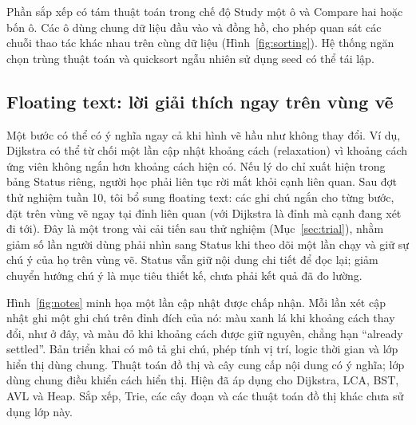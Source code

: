 \documentclass[11pt,a4paper]{article}
\begin{document}
\FloatBarrier
Phần sắp xếp có tám thuật toán trong chế độ Study một ô và Compare hai hoặc bốn ô. Các ô dùng chung dữ liệu đầu vào và đồng hồ, cho phép quan sát các chuỗi thao tác khác nhau trên cùng dữ liệu (Hình~\ref{fig:sorting}). Hệ thống ngăn chọn trùng thuật toán và quicksort ngẫu nhiên sử dụng seed có thể tái lập.

\FloatBarrier

\subsection{Floating text: lời giải thích ngay trên vùng vẽ}\label{sec:notes}
Một bước có thể có ý nghĩa ngay cả khi hình vẽ hầu như không thay đổi. Ví dụ, Dijkstra có thể từ chối một lần cập nhật khoảng cách (relaxation) vì khoảng cách ứng viên không ngắn hơn khoảng cách hiện có. Nếu lý do chỉ xuất hiện trong bảng Status riêng, người học phải liên tục rời mắt khỏi cạnh liên quan. Sau đợt thử nghiệm tuần 10, tôi bổ sung floating text: các ghi chú ngắn cho từng bước, đặt trên vùng vẽ ngay tại đỉnh liên quan (với Dijkstra là đỉnh mà cạnh đang xét đi tới). Đây là một trong vài cải tiến sau thử nghiệm (Mục~\ref{sec:trial}), nhằm giảm số lần người dùng phải nhìn sang Status khi theo dõi một lần chạy và giữ sự chú ý của họ trên vùng vẽ. Status vẫn giữ nội dung chi tiết để đọc lại; giảm chuyển hướng chú ý là mục tiêu thiết kế, chưa phải kết quả đã đo lường.

\FloatBarrier
Hình~\ref{fig:notes} minh họa một lần cập nhật được chấp nhận. Mỗi lần xét cập nhật ghi một ghi chú trên đỉnh đích của nó: màu xanh lá khi khoảng cách thay đổi, như ở đây, và màu đỏ khi khoảng cách được giữ nguyên, chẳng hạn ``already settled''. Bản triển khai có mô tả ghi chú, phép tính vị trí, logic thời gian và lớp hiển thị dùng chung. Thuật toán đồ thị và cây cung cấp nội dung có ý nghĩa; lớp dùng chung điều khiển cách hiển thị. Hiện đã áp dụng cho Dijkstra, LCA, BST, AVL và Heap. Sắp xếp, Trie, các cây đoạn và các thuật toán đồ thị khác chưa sử dụng lớp này.
\end{document}
